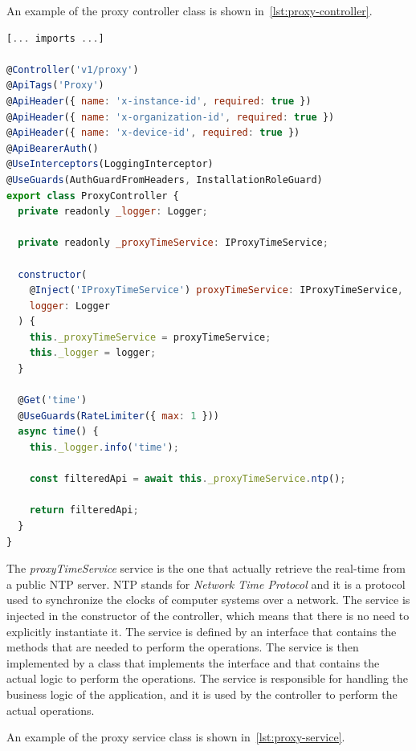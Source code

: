 An example of the proxy controller class is shown in~\cref{lst:proxy-controller}.

\noindent\begin{minipage}{\linewidth}
  \vspace{0.5cm}
  \begin{lstlisting}[language=Javascript, caption={Proxy controller class}, label={lst:proxy-controller}]
[... imports ...]

@Controller('v1/proxy')
@ApiTags('Proxy')
@ApiHeader({ name: 'x-instance-id', required: true })
@ApiHeader({ name: 'x-organization-id', required: true })
@ApiHeader({ name: 'x-device-id', required: true })
@ApiBearerAuth()
@UseInterceptors(LoggingInterceptor)
@UseGuards(AuthGuardFromHeaders, InstallationRoleGuard)
export class ProxyController {
  private readonly _logger: Logger;

  private readonly _proxyTimeService: IProxyTimeService;

  constructor(
    @Inject('IProxyTimeService') proxyTimeService: IProxyTimeService,
    logger: Logger
  ) {
    this._proxyTimeService = proxyTimeService;
    this._logger = logger;
  }

  @Get('time')
  @UseGuards(RateLimiter({ max: 1 }))
  async time() {
    this._logger.info('time');

    const filteredApi = await this._proxyTimeService.ntp();

    return filteredApi;
  }
}
\end{lstlisting}
\end{minipage}

The \textit{proxyTimeService} service is the one that actually retrieve the real-time from a public NTP server. NTP stands for \textit{Network Time Protocol} and it is a protocol used to synchronize the clocks of computer systems over a network. The service is injected in the constructor of the controller, which means that there is no need to explicitly instantiate it. The service is defined by an interface that contains the methods that are needed to perform the operations. The service is then implemented by a class that implements the interface and that contains the actual logic to perform the operations. The service is responsible for handling the business logic of the application, and it is used by the controller to perform the actual operations.

An example of the proxy service class is shown in~\cref{lst:proxy-service}.

